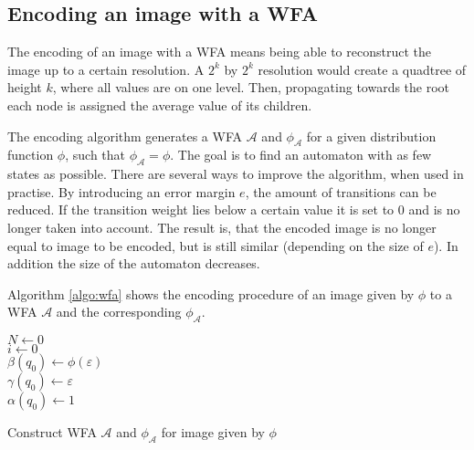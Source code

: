 \documentclass{article}
\begin{document}
\subsection{Encoding an image with a WFA}
The encoding of an image with a WFA means being able to reconstruct the image up to a certain resolution. A $2^k$ by $2^k$ resolution would create a quadtree of height $k$, where all values are on one level. Then, propagating towards the root each node is assigned the average value of its children.

The encoding algorithm generates a WFA $\mathcal A$ and $\phi_\mathcal A$ for a given distribution function $\phi$, such that $\phi_\mathcal A = \phi$. The goal is to find an automaton with as few states as possible. There are several ways to improve the algorithm, when used in practise. By introducing an error margin $e$, the amount of transitions can be reduced. If the transition weight lies below a certain value it is set to 0 and is no longer taken into account. The result is, that the encoded image is no longer equal to image to be encoded, but is still similar (depending on the size of $e$). In addition the size of the automaton decreases.

Algorithm \ref{algo:wfa} shows the encoding procedure of an image given by $\phi$ to a WFA $\mathcal{A}$ and the corresponding $\phi_\mathcal A$.
\newline


\begin{algorithm}[H]
\label{algo:wfa}
\SetAlgoLined
\label{algo:add}
$N \gets 0$\\
$i \gets 0$\\
$\beta(q_0) \gets \phi(\varepsilon)$\\
$\gamma(q_0) \gets \varepsilon$\\
$\alpha(q_0) \gets 1$\\


\caption{Construct WFA $\mathcal{A}$ and $\phi_\mathcal{A}$ for image given by $\phi$}
\end{algorithm}
\end{document}

